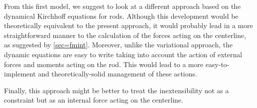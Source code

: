 From this first model, we suggest to look at a different approach based on the dynamical Kirchhoff equations for rods. Although this development would be theoretically equivalent to the present approach, it would probably lead in a more straightforward manner to the calculation of the forces acting on the centerline, as suggested by \cref{sec=fmint}. Moreover, unlike the variational approach, the dynamic equations are easy to write taking into account the action of external forces and moments acting on the rod. This would lead to a more easy-to-implement and theoretically-solid management of these actions.

Finally, this approach might be better to treat the inextensibility not as a constraint but as an internal force acting on the centerline.
